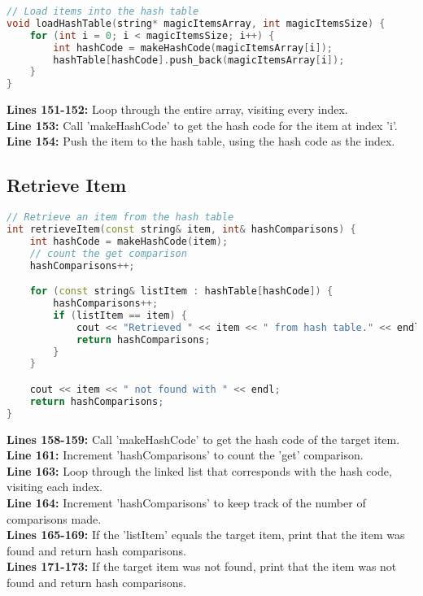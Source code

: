 \documentclass[letterpaper, 10pt,DIV=13]{scrartcl}
\numberwithin{equation}{section} %
\numberwithin{figure}{section} %
\numberwithin{table}{section} %
\begin{document}
\begin{linenumbers}
\begin{lstlisting}[language=C++, caption={Load Hash Table}, label={code:example}]
// Load items into the hash table
void loadHashTable(string* magicItemsArray, int magicItemsSize) {
    for (int i = 0; i < magicItemsSize; i++) {
        int hashCode = makeHashCode(magicItemsArray[i]);
        hashTable[hashCode].push_back(magicItemsArray[i]);
    }
}
\end{lstlisting}
\end{linenumbers}
\nolinenumbers

\textbf{Lines 151-152:} Loop through the entire array, visiting every index. \\
\textbf{Line 153:} Call 'makeHashCode' to get the hash code for the item at index 'i'. \\
\textbf{Line 154:} Push the item to the hash table, using the hash code as the index. \\

\subsection{Retrieve Item}

\begin{linenumbers}
\begin{lstlisting}[language=C++, caption={Retrieve Item}, label={code:example}]
// Retrieve an item from the hash table
int retrieveItem(const string& item, int& hashComparisons) {
    int hashCode = makeHashCode(item);
    // count the get comparison
    hashComparisons++;

    for (const string& listItem : hashTable[hashCode]) {
        hashComparisons++;
        if (listItem == item) {
            cout << "Retrieved " << item << " from hash table." << endl;
            return hashComparisons;
        }
    }

    cout << item << " not found with " << endl;
    return hashComparisons;
}
\end{lstlisting}
\end{linenumbers}
\nolinenumbers

\textbf{Lines 158-159:} Call 'makeHashCode' to get the hash code of the target item. \\
\textbf{Line 161:} Increment 'hashComparisons' to count the 'get' comparison. \\
\textbf{Line 163:} Loop through the linked list that corresponds with the hash code, visiting each index. \\
\textbf{Line 164:} Increment 'hashComparisons' to keep track of the number of comparisons made. \\
\textbf{Lines 165-169:} If the 'listItem' equals the target item, print that the item was found and return hash comparisons. \\
\textbf{Lines 171-173:} If the target item was not found, print that the item was not found and return hash comparisons. \\
\end{document}

